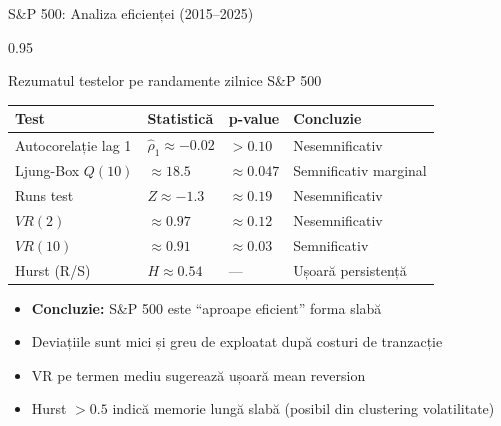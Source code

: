 \documentclass[9pt, aspectratio=169, t]{beamer}
\begin{document}
\begin{frame}{S\&P 500: Analiza eficienței (2015--2025)}
    \begin{cminipage}{0.95\textwidth}
\begin{block}{Rezumatul testelor pe randamente zilnice S\&P 500}
\renewcommand{\arraystretch}{1.1}
\begin{center}
\footnotesize
\begin{tabular}{llll}
\toprule
\textbf{Test} & \textbf{Statistică} & \textbf{p-value} & \textbf{Concluzie} \\
\midrule
Autocorelație lag 1 & $\hat\rho_1 \approx -0.02$ & $> 0.10$ & Nesemnificativ \\
Ljung-Box $Q(10)$ & $\approx 18.5$ & $\approx 0.047$ & Semnificativ marginal \\
Runs test & $Z \approx -1.3$ & $\approx 0.19$ & Nesemnificativ \\
$VR(2)$ & $\approx 0.97$ & $\approx 0.12$ & Nesemnificativ \\
$VR(10)$ & $\approx 0.91$ & $\approx 0.03$ & Semnificativ \\
Hurst (R/S) & $H \approx 0.54$ & --- & Ușoară persistență \\
\bottomrule
\end{tabular}
\end{center}
\end{block}

\begin{itemize}\setlength{\itemsep}{0pt}
    \item \textbf{Concluzie:} S\&P 500 este ``aproape eficient'' forma slabă
    \item Deviațiile sunt mici și greu de exploatat după costuri de tranzacție
    \item VR pe termen mediu sugerează ușoară mean reversion
    \item Hurst $> 0.5$ indică memorie lungă slabă (posibil din clustering volatilitate)
\end{itemize}
    \end{cminipage}
\end{frame}
\end{document}
